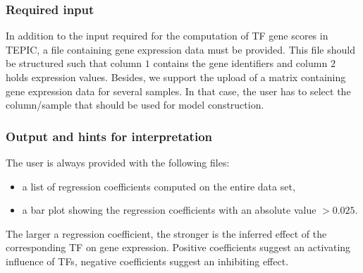 \documentclass{article}
\begin{document}
\subsubsection*{Required input}
In addition to the input required for the computation of TF gene scores in TEPIC, a file containing gene expression data must be provided.
This file should be structured such that column $1$ contains the gene identifiers and column $2$ holds expression values.
Besides, we support the upload of a matrix containing gene expression data for several samples. In that case, the user has to select the column/sample that should
be used for model construction. 

\subsubsection*{Output and hints for interpretation}
The user is always provided with the following files:
\begin{itemize}
\item a list of regression coefficients computed on the entire data set,
\item a bar plot showing the regression coefficients with an absolute value $> 0.025$.
\end{itemize}
The larger a regression coefficient, the stronger is the inferred effect of the corresponding TF on gene expression. Positive coefficients suggest an activating influence of TFs,
negative coefficients suggest an inhibiting effect. 
\end{document}
